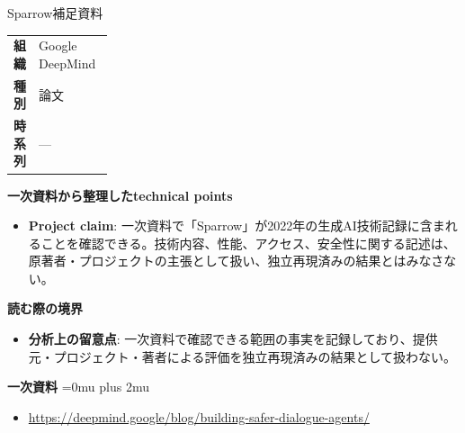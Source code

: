 \begin{technicalnote}{Sparrow}{補足資料}
\begingroup
\begin{tabularx}{\linewidth}{@{}>{\bfseries}p{0.22\linewidth}X@{}}
組織 & Google DeepMind \\
種別 & 論文 \\
時系列 & — \\
\end{tabularx}
\smallskip
{\bfseries 一次資料から整理したtechnical points}
\begin{itemize}[leftmargin=1.5em,itemsep=0.35em]
\item \textbf{Project claim}: 一次資料で「Sparrow」が2022年の生成AI技術記録に含まれることを確認できる。技術内容、性能、アクセス、安全性に関する記述は、原著者・プロジェクトの主張として扱い、独立再現済みの結果とはみなさない。
\end{itemize}
\begin{minipage}{\linewidth}
{\bfseries 読む際の境界}
\begin{itemize}[leftmargin=1.5em,itemsep=0.35em]
\item \textbf{分析上の留意点}: 一次資料で確認できる範囲の事実を記録しており、提供元・プロジェクト・著者による評価を独立再現済みの結果として扱わない。
\end{itemize}
\begin{samepage}
{\bfseries 一次資料}
\begingroup\sloppy
\Urlmuskip=0mu plus 2mu\relax
\begin{itemize}[leftmargin=1.5em,itemsep=0.25em]
\item {\scriptsize\url{https://deepmind.google/blog/building-safer-dialogue-agents/}}
\end{itemize}
\endgroup
\end{samepage}
\end{minipage}
\endgroup
\end{technicalnote}
\medskip

